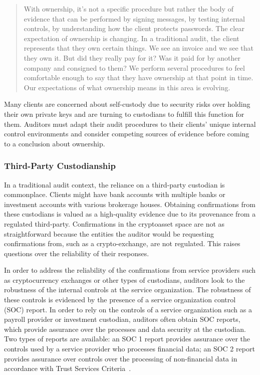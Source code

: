 \begin{quote}
With ownership, it's not a specific procedure but rather the body of evidence that can be performed by signing messages, by testing internal controls, by understanding how the client protects passwords. The clear expectation of ownership is changing. In a traditional audit, the client represents that they own certain things. We see an invoice and we see that they own it. But did they really pay for it? Was it paid for by another company and consigned to them? We perform several procedures to feel comfortable enough to say that they have ownership at that point in time. Our expectations of what ownership means in this area is evolving.
\end{quote}

Many clients are concerned about self-custody due to security risks over holding their own private keys and are turning to custodians to fulfill this function for them. Auditors must adapt their audit procedures to their clients' unique internal control environments and consider competing sources of evidence before coming to a conclusion about ownership. 

\subsubsection{Third-Party Custodianship}\label{sec:auditing:framework:ownership:custodianship}
In a traditional audit context, the reliance on a third-party custodian is commonplace. Clients might have bank accounts with multiple banks or investment accounts with various brokerage houses. Obtaining confirmations from these custodians is valued as a high-quality evidence due to its provenance from a regulated third-party. Confirmations in the cryptoasset space are not as straightforward because the entities the auditor would be requesting confirmations from, such as a crypto-exchange, are not regulated. This raises questions over the reliability of their responses. 

In order to address the reliability of the confirmations from service providers such as cryptocurrency exchanges or other types of custodians, auditors look to the robustness of the internal controls at the service organization. The robustness of these controls is evidenced by the presence of a service organization control (SOC) report. In order to rely on the controls of a service organization such as a payroll provider or investment custodian, auditors often obtain SOC reports, which provide assurance over the processes and data security at the custodian. Two types of reports are available: an SOC 1 report provides assurance over the controls used by a service provider who processes financial data; an SOC 2 report provides assurance over controls over the processing of non-financial data in accordance with Trust Services Criteria~\cite{bdosocreports}. 

